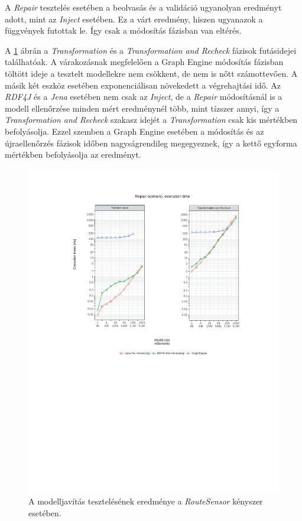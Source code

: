 A \emph{Repair} tesztelés esetében a beolvasás és a validáció ugyanolyan eredményt adott, mint az \emph{Inject} esetében. Ez a várt eredmény, hiszen ugyanazok a függvények futottak le. Így csak a módosítás fázisban van eltérés.

A \ref{fig:RepairResultTransformation} ábrán a \emph{Transformation} és a \emph{Transformation and Recheck} fázisok futásidejei találhatóak. A várakozásnak megfelelően a Graph Engine módosítás fázisban töltött ideje a tesztelt modellekre nem csökkent, de nem is nőtt számottevően. A másik két eszköz esetében exponenciálisan növekedett a végrehajtási idő. Az \emph{RDF4J} és a \emph{Jena} esetében nem csak az \emph{Inject}, de a \emph{Repair} módosításnál is a modell ellenőrzése minden mért eredménynél több, mint tízszer annyi, így a \emph{Transformation and Recheck} szakasz idejét a \emph{Transformation} csak kis mértékben befolyásolja. Ezzel szemben a Graph Engine esetében a módosítás és az újraellenőrzés fázisok időben nagyságrendileg megegyeznek, így a kettő egyforma mértékben befolyásolja az eredményt.

\begin{figure}[H]
	\centering
	\includegraphics{figures/times-Repair-Transformation-Recheck.pdf}
	\caption{A modelljavítás tesztelésének eredménye a \emph{RouteSensor} kényszer esetében.}
	\label{fig:RepairResultTransformation}
\end{figure}

